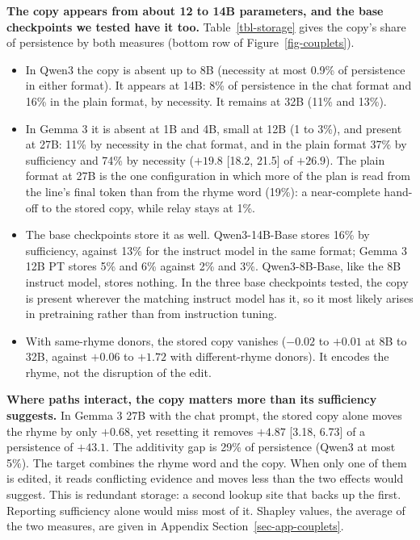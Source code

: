 \documentclass[
]{article}
\providecommand{\tightlist}{%
  \setlength{\itemsep}{0pt}\setlength{\parskip}{0pt}}
\begin{document}
\textbf{The copy appears from about 12 to 14B parameters, and the base
checkpoints we tested have it too.} Table~\ref{tbl-storage} gives the
copy's share of persistence by both measures (bottom row of
Figure~\ref{fig-couplets}).

\begin{itemize}
\tightlist
\item
  In Qwen3 the copy is absent up to 8B (necessity at most 0.9\% of
  persistence in either format). It appears at 14B: 8\% of persistence
  in the chat format and 16\% in the plain format, by necessity. It
  remains at 32B (11\% and 13\%).
\item
  In Gemma 3 it is absent at 1B and 4B, small at 12B (1 to 3\%), and
  present at 27B: 11\% by necessity in the chat format, and in the plain
  format 37\% by sufficiency and 74\% by necessity (\(+19.8\) {[}18.2,
  21.5{]} of \(+26.9\)). The plain format at 27B is the one
  configuration in which more of the plan is read from the line's final
  token than from the rhyme word (19\%): a near-complete hand-off to the
  stored copy, while relay stays at 1\%.
\item
  The base checkpoints store it as well. Qwen3-14B-Base stores 16\% by
  sufficiency, against 13\% for the instruct model in the same format;
  Gemma 3 12B PT stores 5\% and 6\% against 2\% and 3\%. Qwen3-8B-Base,
  like the 8B instruct model, stores nothing. In the three base
  checkpoints tested, the copy is present wherever the matching instruct
  model has it, so it most likely arises in pretraining rather than from
  instruction tuning.
\item
  With same-rhyme donors, the stored copy vanishes (\(-0.02\) to
  \(+0.01\) at 8B to 32B, against \(+0.06\) to \(+1.72\) with
  different-rhyme donors). It encodes the rhyme, not the disruption of
  the edit.
\end{itemize}

\textbf{Where paths interact, the copy matters more than its sufficiency
suggests.} In Gemma 3 27B with the chat prompt, the stored copy alone
moves the rhyme by only \(+0.68\), yet resetting it removes \(+4.87\)
{[}3.18, 6.73{]} of a persistence of \(+43.1\). The additivity gap is
29\% of persistence (Qwen3 at most 5\%). The target combines the rhyme
word and the copy. When only one of them is edited, it reads conflicting
evidence and moves less than the two effects would suggest. This is
redundant storage: a second lookup site that backs up the first.
Reporting sufficiency alone would miss most of it. Shapley values, the
average of the two measures, are given in Appendix
Section~\ref{sec-app-couplets}.
\end{document}

